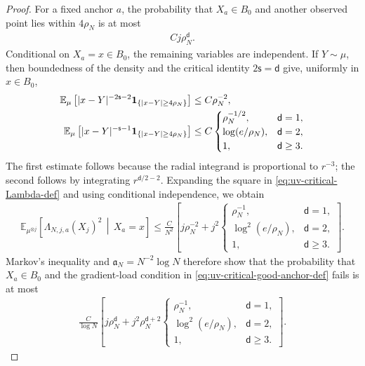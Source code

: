 \documentclass[11pt,reqno]{amsart}
\numberwithin{equation}{section}
\theoremstyle{plain}
\theoremstyle{remark}
\DeclarePairedDelimiter{\abs}{\lvert}{\rvert}
\renewcommand{\d}{\mathsf{d}}
\newcommand{\E}{{\mathbb{E}}}
\newcommand{\s}{\mathsf{s}}
\newcommand{\one}{\mathbf 1}
\begin{document}
\begin{proof}
For a fixed anchor \(a\), the probability that \(X_a\in B_0\) and another observed point lies within \(4\rho_N\) is at most
\begin{align}\label{eq:uv-critical-close-anchor-probability}
 Cj\rho_N^\d.
\end{align}
Conditional on \(X_a=x\in B_0\), the remaining variables are independent.  If \(Y\sim\mu\), then boundedness of the density and the critical identity \(2\s=\d\) give, uniformly in \(x\in B_0\),
\begin{align}
 \E_\mu\left[\abs{x-Y}^{-2\s-2}
 \one_{\{\abs{x-Y}\ge4\rho_N\}}\right]
 &\le C\rho_N^{-2},
 \label{eq:uv-critical-gradient-kernel-second-moment}\\
 \E_\mu\left[\abs{x-Y}^{-\s-1}
 \one_{\{\abs{x-Y}\ge4\rho_N\}}\right]
 &\le C
 \begin{cases}
 \rho_N^{-1/2},&\d=1,\\
 \log(e/\rho_N),&\d=2,\\
 1,&\d\ge3.
 \end{cases}
 \label{eq:uv-critical-gradient-kernel-first-moment}
\end{align}
The first estimate follows because the radial integrand is proportional to \(r^{-3}\); the second follows by integrating \(r^{\d/2-2}\).  Expanding the square in \eqref{eq:uv-critical-Lambda-def} and using conditional independence, we obtain
\begin{align}\label{eq:uv-critical-Lambda-second-moment}
 \E_{\mu^{\otimes j}}\left[
 \Lambda_{N,j,a}(X_j)^2\,\middle|\,X_a=x
 \right]
 \le\frac C{N^2}\left[
 j\rho_N^{-2}+j^2
 \begin{cases}
 \rho_N^{-1},&\d=1,\\
 \log^2(e/\rho_N),&\d=2,\\
 1,&\d\ge3.
 \end{cases}
 \right].
\end{align}
Markov's inequality and \(\mathfrak a_N=N^{-2}\log N\) therefore show that the probability that \(X_a\in B_0\) and the gradient-load condition in \eqref{eq:uv-critical-good-anchor-def} fails is at most
\begin{align}\label{eq:uv-critical-gradient-bad-probability}
 \frac C{\log N}\left[
 j\rho_N^\d+j^2\rho_N^{\d+2}
 \begin{cases}
 \rho_N^{-1},&\d=1,\\
 \log^2(e/\rho_N),&\d=2,\\
 1,&\d\ge3.
 \end{cases}
 \right].
\end{align}

\end{proof}
\end{document}
